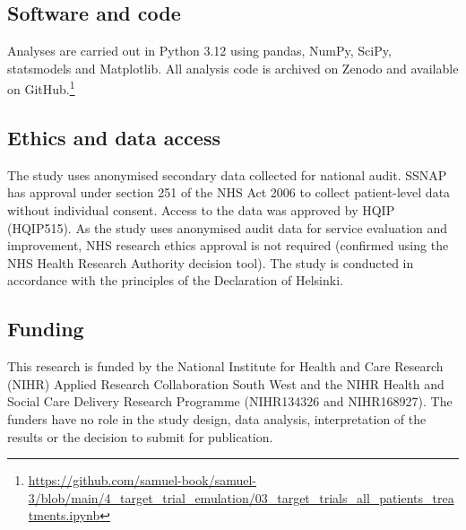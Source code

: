 \subsection{Software and code}

Analyses are carried out in Python 3.12 using pandas\cite{mckinney_data_2010}, NumPy\cite{harris_array_2020}, SciPy\cite{virtanen_scipy_2020}, statsmodels\cite{seabold_statsmodels_2010} and Matplotlib\cite{hunter_matplotlib_2007}. All analysis code is archived on Zenodo\cite{allen_samuel3_2026} and available on GitHub.\footnote{\url{https://github.com/samuel-book/samuel-3/blob/main/4_target_trial_emulation/03_target_trials_all_patients_treatments.ipynb}}

\subsection{Ethics and data access}

The study uses anonymised secondary data collected for national audit. SSNAP has approval under section 251 of the NHS Act 2006 to collect patient-level data without individual consent. Access to the data was approved by HQIP (HQIP515). As the study uses anonymised audit data for service evaluation and improvement, NHS research ethics approval is not required (confirmed using the NHS Health Research Authority decision tool). The study is conducted in accordance with the principles of the Declaration of Helsinki.

\subsection{Funding}

This research is funded by the National Institute for Health and Care Research (NIHR) Applied Research Collaboration South West and the NIHR Health and Social Care Delivery Research Programme (NIHR134326 and NIHR168927). The funders have no role in the study design, data analysis, interpretation of the results or the decision to submit for publication.
